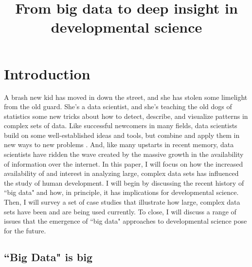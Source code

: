 \documentclass[letterpaper,man,apacite]{apa6}
\title{From big data to deep insight in developmental science}
\begin{document}
\maketitle

\section{Introduction}

A brash new kid has moved in down the street, and she has stolen some limelight from the old guard.
She's a data scientist, and she's teaching the old dogs of statistics some new tricks about how to detect, describe, and visualize patterns in complex sets of data.
Like successful newcomers in many fields, data scientists build on some well-established ideas and tools, but combine and apply them in new ways to new problems \cite{Press2013b}.
And, like many upstarts in recent memory, data scientists have ridden the wave created by the massive growth in the availability of information over the internet.
In this paper, I will focus on how the increased availability of and interest in analyzing large, complex data sets has influenced the study of human development.
I will begin by discussing the recent history of ``big data" and how, in principle, it has implications for developmental science.
Then, I will survey a set of case studies that illustrate how large, complex data sets have been and are being used currently.
To close, I will discuss a range of issues that the emergence of ``big data" approaches to developmental science pose for the future.

\subsection{``Big Data" is big}
\end{document}
